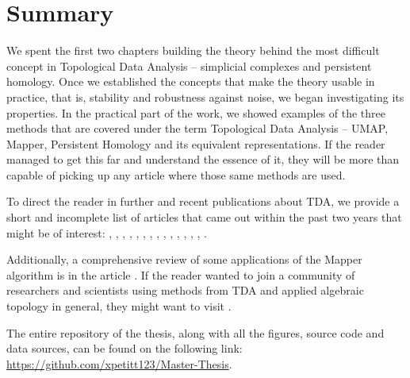 \chapter*{Summary}

We spent the first two chapters building the theory behind the most difficult concept in Topological Data Analysis -- simplicial complexes and persistent homology. Once we established the concepts that make the theory usable in practice, that is, stability and robustness against noise, we began investigating its properties. In the practical part of the work, we showed examples of the three methods that are covered under the term Topological Data Analysis -- UMAP, Mapper, Persistent Homology and its equivalent representations. If the reader managed to get this far and understand the essence of it, they will be more than capable of picking up any article where those same methods are used.

To direct the reader in further and recent publications about TDA, we provide a short and incomplete list of articles that came out within the past two years that might be of interest: \cite{wei2025short}, \cite{ali2025leveraging}, \cite{jing2025topology}, \cite{jetomo2025filipino}, \cite{wiseman2025persistent}, \cite{arun2025topo}, \cite{mototaketopological}, \cite{pedersen2024active}, \cite{luchinsky2024tdavec}, \cite{hernandez2024topological}, \cite{cuerno2025topological}, \cite{arfi2024promises}, \cite{dos2025topological}, \cite{selicato2025topological}, \cite{boyd2024big}.

Additionally, a comprehensive review of some applications of the Mapper algorithm is in the article \cite{madukpe2025comprehensive}. If the reader wanted to join a community of researchers and scientists using methods from TDA and applied algebraic topology in general, they might want to visit \cite{AATRN}.

The entire repository of the thesis, along with all the figures, source code and data sources, can be found on the following link: \url{https://github.com/xpetitt123/Master-Thesis}.
